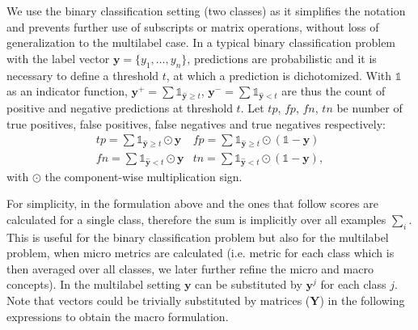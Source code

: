 


We use the binary classification setting (two classes) as it simplifies the notation and prevents further use of subscripts or matrix operations, without loss of generalization to the multilabel case.
In a typical binary classification problem with the label vector $\mathbf{y} = \{y_1 , \ldots, y_n\}$, predictions are probabilistic and it is necessary to define a threshold \(t\), at which a prediction is dichotomized. With \(\mathds{1}\) as an indicator function, \(\mathbf{y}^+ = \sum \mathds{1}_{\hat{\mathbf{y}} \geq t}\), \(\mathbf{y}^- = \sum \mathds{1}_{\hat{\mathbf{y}} < t}\) are thus the count of positive and negative predictions at threshold \(t\). Let \(tp\), \(fp\), \(fn\), \(tn\) be number of true positives, false positives, false negatives and true negatives respectively:
%
\begin{equation}
\label{eq:conf}
\begin{array}{ll}\mathit{tp} = \sum \mathds{1}_{\hat{\mathbf{y}} \geq t} \odot \mathbf{y}  & \mathit{fp} = \sum \mathds{1}_{\hat{\mathbf{y}} \geq t} \odot (\mathds{1} - \mathbf{y}) \\[.5em] \mathit{fn} = \sum \mathds{1}_{\hat{\mathbf{y}} < t} \odot \mathbf{y} & \mathit{tn} = \sum \mathds{1}_{\hat{\mathbf{y}} < t} \odot (\mathds{1} - \mathbf{y}),
\end{array}
\end{equation}
%
with \(\odot\) the component-wise multiplication sign.


For simplicity, in the formulation above and the ones that follow scores are calculated for a single class, therefore the sum is implicitly over all examples \(\sum_i\). This is useful for the binary classification problem but also for the multilabel problem, when micro metrics are calculated (i.e. metric for each class which is then averaged over all classes, we later further refine the micro and macro concepts). In the multilabel setting $\mathbf{y}$ can be substituted by $\mathbf{y}^j$ for each class $j$. Note that vectors could be trivially substituted by matrices ($\mathbf{Y}$) in the following expressions to obtain the macro formulation.


